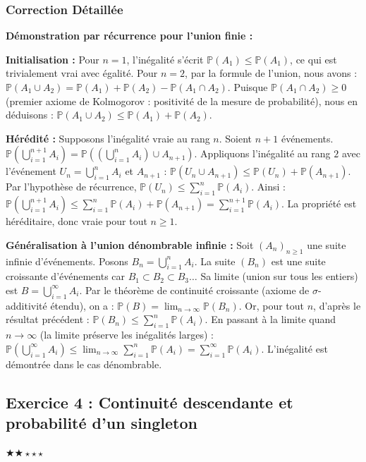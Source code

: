 \documentclass[11pt,a4paper]{article}
\begin{document}
\subsubsection*{Correction Détaillée}

\textbf{Démonstration par récurrence pour l'union finie :}

\textbf{Initialisation :}
Pour $n=1$, l'inégalité s'écrit $\mathbb{P}(A_1) \le \mathbb{P}(A_1)$, ce qui est trivialement vrai avec égalité.
Pour $n=2$, par la formule de l'union, nous avons :
$\mathbb{P}(A_1 \cup A_2) = \mathbb{P}(A_1) + \mathbb{P}(A_2) - \mathbb{P}(A_1 \cap A_2)$.
Puisque $\mathbb{P}(A_1 \cap A_2) \ge 0$ (premier axiome de Kolmogorov : positivité de la mesure de probabilité), nous en déduisons :
$\mathbb{P}(A_1 \cup A_2) \le \mathbb{P}(A_1) + \mathbb{P}(A_2)$.

\textbf{Hérédité :}
Supposons l'inégalité vraie au rang $n$. Soient $n+1$ événements.
$\mathbb{P}\left(\bigcup_{i=1}^{n+1} A_i\right) = \mathbb{P}\left(\left(\bigcup_{i=1}^n A_i\right) \cup A_{n+1}\right)$.
Appliquons l'inégalité au rang $2$ avec l'événement $U_n = \bigcup_{i=1}^n A_i$ et $A_{n+1}$ :
$\mathbb{P}(U_n \cup A_{n+1}) \le \mathbb{P}(U_n) + \mathbb{P}(A_{n+1})$.
Par l'hypothèse de récurrence, $\mathbb{P}(U_n) \le \sum_{i=1}^n \mathbb{P}(A_i)$.
Ainsi :
$\mathbb{P}\left(\bigcup_{i=1}^{n+1} A_i\right) \le \sum_{i=1}^n \mathbb{P}(A_i) + \mathbb{P}(A_{n+1}) = \sum_{i=1}^{n+1} \mathbb{P}(A_i)$.
La propriété est héréditaire, donc vraie pour tout $n \ge 1$.

\textbf{Généralisation à l'union dénombrable infinie :}
Soit $(A_n)_{n \ge 1}$ une suite infinie d'événements.
Posons $B_n = \bigcup_{i=1}^n A_i$.
La suite $(B_n)$ est une suite croissante d'événements car $B_1 \subset B_2 \subset B_3 \dots$
Sa limite (union sur tous les entiers) est $B = \bigcup_{i=1}^\infty A_i$.
Par le théorème de continuité croissante (axiome de $\sigma$-additivité étendu), on a :
$\mathbb{P}(B) = \lim_{n \to \infty} \mathbb{P}(B_n)$.
Or, pour tout $n$, d'après le résultat précédent :
$\mathbb{P}(B_n) \le \sum_{i=1}^n \mathbb{P}(A_i)$.
En passant à la limite quand $n \to \infty$ (la limite préserve les inégalités larges) :
$\mathbb{P}\left(\bigcup_{i=1}^\infty A_i\right) \le \lim_{n \to \infty} \sum_{i=1}^n \mathbb{P}(A_i) = \sum_{i=1}^\infty \mathbb{P}(A_i)$.
L'inégalité est démontrée dans le cas dénombrable.



\subsection*{Exercice 4 : Continuité descendante et probabilité d'un singleton}
$\bigstar\bigstar\star\star\star$
\end{document}
